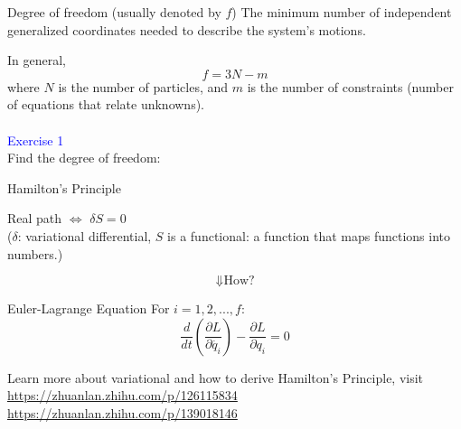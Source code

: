 \documentclass{beamer}
\begin{document}
\begin{frame}
  \begin{block}{Degree of freedom (usually denoted by $f$)}
    The minimum number of independent generalized coordinates needed to describe the system's motions.
  \end{block}\pause
  In general, 
  $$
  f = 3N - m
  $$
  where $N$ is the number of particles, and $m$ is the number of constraints (number of equations that relate unknowns).\pause\\
~\\
 \textcolor{blue}{Exercise 1}\\
 Find the degree of freedom:
 \begin{figure}[H]%
  \centering
  \label{11}
  \label{12}
\end{figure}
\end{frame}

\begin{frame}
  \begin{block}{Hamilton's Principle}
    \begin{center}
    Real path $\Longleftrightarrow$ $\delta S = 0$\\ ($\delta$: variational differential, $S$ is a functional: a function that maps functions into numbers.)
    \end{center}
  \end{block} \pause
  $$\Downarrow \text{How?}$$
  \begin{block}{Euler-Lagrange Equation}
    For $i = 1, 2,...,f$:
    $$
    \frac{d}{dt}(\frac{\partial L}{\partial \dot{q_i}})-\frac{\partial L}{\partial q_i} = 0
    $$
  \end{block}\pause
  Learn more about variational and how to derive Hamilton's Principle, visit\\ \url{https://zhuanlan.zhihu.com/p/126115834}\\ \url{https://zhuanlan.zhihu.com/p/139018146}
\end{frame}
\end{document}
